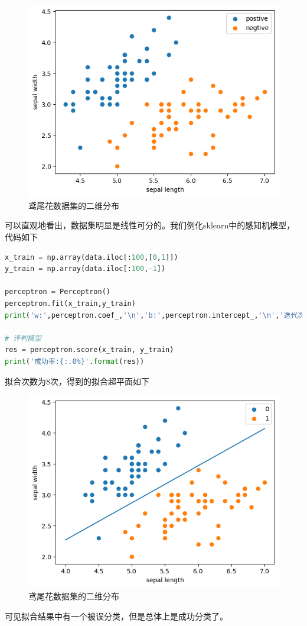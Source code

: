 \begin{figure}[H]
    \centering
    \includegraphics[scale=0.6]{figures/鸢尾花花萼图像.png}
    \caption{鸢尾花数据集的二维分布}
\end{figure}

可以直观地看出，数据集明显是线性可分的。我们例化sklearn中的感知机模型，代码如下
\begin{lstlisting}[language=Python]
x_train = np.array(data.iloc[:100,[0,1]])
y_train = np.array(data.iloc[:100,-1])

perceptron = Perceptron()
perceptron.fit(x_train,y_train)
print('w:',perceptron.coef_,'\n','b:',perceptron.intercept_,'\n','迭代次数:',perceptron.n_iter_)
    
# 评判模型
res = perceptron.score(x_train, y_train)
print('成功率:{:.0%}'.format(res))
\end{lstlisting}

拟合次数为8次，得到的拟合超平面如下
\begin{figure}[H]
    \centering
    \includegraphics[scale=0.6]{figures/鸢尾花数据拟合超平面.png}
    \caption{鸢尾花数据集的二维分布}
\end{figure}

可见拟合结果中有一个被误分类，但是总体上是成功分类了。